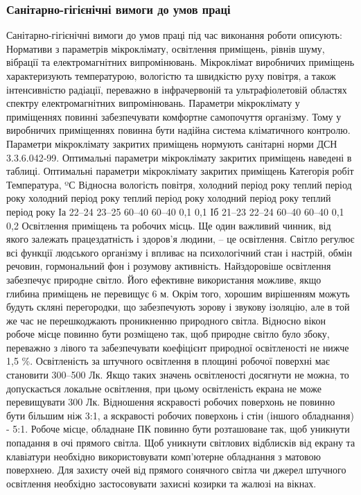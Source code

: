 \documentclass[12pt,a4paper]{article}
\begin{document}
\subsubsection{Санітарно-гігієнічні вимоги до умов праці}
Санітарно-гігієнічні вимоги до умов праці під час виконання роботи описують:
Нормативи з параметрів мікроклімату, освітлення приміщень, рівнів шуму, вібрації та електромагнітних випромінювань.
Мікроклімат виробничих приміщень характеризують температурою, вологістю та  швидкістю руху повітря, а також інтенсивністю радіації, переважно в інфрачервоній та ультрафіолетовій областях спектру електромагнітних випромінювань.
Параметри мікроклімату у приміщеннях повинні забезпечувати комфортне самопочуття організму. Тому у виробничих приміщеннях повинна бути надійна система кліматичного контролю. 
Параметри мікроклімату закритих приміщень нормують санітарні норми ДСН 3.3.6.042‑99. Оптимальні параметри мікроклімату закритих приміщень наведені в таблиці.
Оптимальні параметри мікроклімату закритих приміщень
Категорія
робіт	Температура, ºС	Відносна вологість повітря, %
холодний період року	теплий період року	холодний період року	теплий період року	холодний період року	теплий період року
Іа	22–24	23–25	60–40	60–40	0,1	0,1
Іб	21–23	22–24	60–40	60–40	0,1	0,2
Освітлення приміщень та робочих місць. Ще один важливий чинник, від якого залежать працездатність і здоров’я людини, – це освітлення. Світло регулює всі функції людського організму і впливає на психологічний стан і настрій, обмін речовин, гормональний фон і розумову активність. 
Найздоровіше освітлення забезпечує природне світло. Його ефективне використання можливе, якщо глибина приміщень не перевищує 6 м. Окрім того, хорошим вирішенням можуть будуть скляні перегородки, що забезпечують зорову і звукову ізоляцію, але в той же час не перешкоджають проникненню природного світла. 
Відносно вікон робоче місце повинно бути розміщено так, щоб природне світло було збоку, переважно з лівого та забезпечувати коефіцієнт природної освітленості не нижче 1,5 \%. Освітленість за штучного освітлення в площині робочої поверхні має становити 300–500 Лк. Якщо таких значень освітленості досягнути не можна, то допускається локальне освітлення, при цьому освітленість екрана не може перевищувати 300 Лк. Відношення яскравості робочих поверхонь не повинно бути більшим ніж 3:1, а яскравості робочих поверхонь і стін (іншого обладнання) - 5:1. Робоче місце, обладнане ПК повинно бути розташоване так, щоб уникнути попадання в очі прямого світла.
Щоб уникнути світлових відблисків від екрану та клавіатури необхідно використовувати комп’ютерне обладнання з матовою поверхнею. Для захисту очей від прямого сонячного світла чи джерел штучного освітлення необхідно застосовувати захисні козирки та жалюзі на вікнах. 
\end{document}
